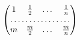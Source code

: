 \documentclass[nofonts]{ctexart}
\begin{document}
\[
	\begin{pmatrix}
		1	& \frac{1}{2}	& \dots	& \frac{1}{n}	\\
		\hdotsfor{4}					\\
		m	& \frac{m}{2}	& \dots	& \frac{m}{n}	
	\end{pmatrix}
\]
\end{document}
